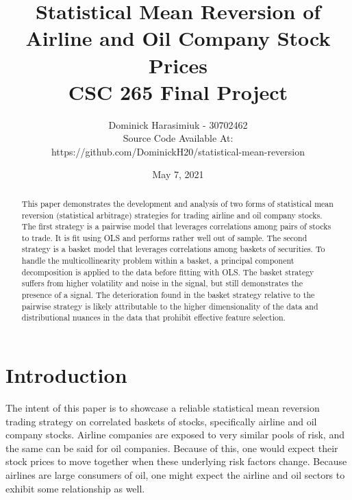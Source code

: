 \documentclass{article}
\title{Statistical Mean Reversion of \\
Airline and Oil Company Stock Prices \\
\large CSC 265 Final Project}
\author{Dominick Harasimiuk - 30702462\\
Source Code Available At:\\ 
https://github.com/DominickH20/statistical-mean-reversion}
\date{May 7, 2021}
\begin{document}
\maketitle

\vspace{1cm}

\begin{abstract}
\noindent
This paper demonstrates the development and analysis of two forms of statistical
mean reversion (statistical arbitrage) strategies for trading airline and oil company
stocks. The first strategy is a pairwise model that leverages correlations among
pairs of stocks to trade. It is fit using OLS and performs rather well out of sample.
The second strategy is a basket model that leverages correlations among baskets of 
securities. To handle the multicollinearity problem within a basket, a principal component
decomposition is applied to the data before fitting with OLS. The basket strategy suffers 
from higher
volatility and noise in the signal, but still demonstrates the presence of a signal. 
The deterioration found in the basket strategy relative to the pairwise strategy is likely
attributable to the higher dimensionality of the data and distributional nuances in the
data that prohibit effective feature selection. 
\end{abstract}

\newpage
\section{Introduction}
The intent of this paper is to showcase a reliable statistical mean reversion trading strategy
on correlated baskets of stocks, specifically airline and oil company stocks. Airline companies
are exposed to very similar pools of risk, and the same can be said for oil companies. Because
of this, one would expect their stock prices to move together when these underlying risk
factors change. Because airlines are large consumers of oil, one might expect the airline and
oil sectors to exhibit some relationship as well.
\end{document}
